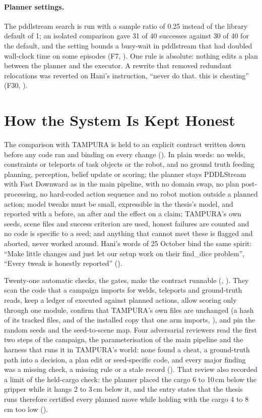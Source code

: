 \paragraph{Planner settings.} The pddlstream search is run with a sample ratio of
0.25 instead of the library default of 1; an isolated comparison gave 31 of 40
successes against 30 of 40 for the default, and the setting bounds a busy-wait in
pddlstream that had doubled wall-clock time on some episodes (F7, ). One rule is absolute: nothing edits a plan between the
planner and the executor. A rewrite that removed redundant relocations was reverted
on Hani's instruction, ``never do that. this is cheating'' (F30, ).

\section{How the System Is Kept Honest}
\label{sec:honest}

The comparison with TAMPURA is held to an explicit contract written down before
any code ran and binding on every change (). In plain words: no welds,
constraints or teleports of task objects or the robot, and no ground truth feeding
planning, perception, belief update or scoring; the planner stays PDDLStream with
Fast Downward as in the main pipeline, with no domain swap, no plan
post-processing, no hard-coded action sequence and no robot motion outside a
planned action; model tweaks must be small, expressible in the thesis's model,
and reported with a before, an after and the effect on a claim; TAMPURA's own
seeds, scene files and success criterion are used, honest failures are counted
and no code is specific to a seed; and anything that cannot meet these is flagged
and aborted, never worked around. Hani's words of 25 October bind the same
spirit: ``Make little changes and just let our setup work on their find\_dice
problem'', ``Every tweak is honestly reported'' ().

Twenty-one automatic checks, the gates, make the contract runnable (,
). They scan the code that a campaign imports for welds, teleports and
ground-truth reads, keep a ledger of executed against planned actions, allow scoring
only through one module, confirm that TAMPURA's own files are unchanged (a hash
of its tracked files, and of the installed copy that one arm imports, ), and pin the random seeds and the seed-to-scene map.
Four adversarial reviewers read the first two steps of the campaign, the
parameterisation of the main pipeline and the harness that runs it in TAMPURA's
world: none found a cheat,
a ground-truth path into a decision, a plan edit or seed-specific code, and every
major finding was a missing check, a missing rule or a stale record
(). That review also recorded a limit of the held-cargo check: the planner placed the
cargo 6 to 10\,cm below the gripper while it hangs 2 to 3\,cm below it, and the
entry states that the thesis runs therefore certified every planned move while
holding with the cargo 4 to 8\,cm too low ().

